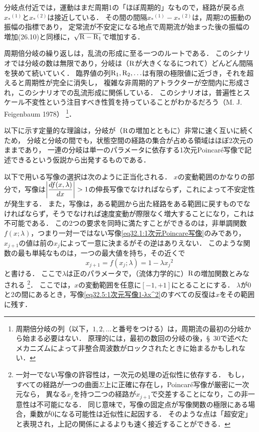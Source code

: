 分岐点付近では，運動はまだ周期1の「ほぼ周期的」なもので，経路が戻る点${x_*}^{(1)}$と${x_*}^{(2)}$は接近している．
その間の間隔${x_*}^{(1)}-{x_*}^{(2)}$は，周期2の振動の振幅の指標であり，
定常流が不安定になる地点で周期流が始まった後の振幅の増加(26.10)と同様に，$\sqrt{\mathrm{R}-\mathrm{R}_1}$で増加する．



周期倍分岐の繰り返しは，乱流の形成に至る一つのルートである．
このシナリオでは分岐の数は無限であり，分岐は（$\mathrm{R}$が大きくなるにつれて）どんどん間隔を狭めて続いていく．
臨界値の列$\mathrm{R}_1, \mathrm{R}_2, \ldots$は有限の極限値に近づき，それを超えると周期性が完全に消失し，
複雑な非周期的アトラクターが空間内に形成され，このシナリオでの乱流形成に関係している．
このシナリオは，普遍性とスケール不変性という注目すべき性質を持っていることがわかるだろう（M. J. Feigenbaum 1978）
\footnote{周期倍分岐の列（以下，$1,2,\ldots$と番号をつける）は，周期流の最初の分岐から始まる必要はない．
原理的には，最初の数回の分岐の後，\S~30で述べたメカニズムによって非整合周波数がロックされたときに始まるかもしれない．}．



以下に示す定量的な理論は，分岐が（$\mathrm{R}$の増加とともに）非常に速く互いに続くため，
分岐と分岐の間でも，状態空間の経路の集合が占める領域はほぼ2次元のままであり，
一連の分岐は単一のパラメータに依存する1次元Poincar\'{e}写像で記述できるという仮説から出発するものである．




以下で用いる写像の選択は次のように正当化される．
$x$の変動範囲のかなりの部分で，写像は$\abs{\ddv{f(x,\lambda)}{x}}>1$の伸長写像でなければならず，これによって不安定性が発生する．
また，写像は，ある範囲から出た経路をある範囲に戻すものでなければならず，そうでなければ速度変動が際限なく増大することになり，これは不可能である．
この2つの要求を同時に満たすことができるのは，非単調関数$f(x;\lambda)$，つまり一対一ではない写像\eqref{eq32.1:1次元Poincare写像}のみであり，
$x_{j+1}$の値は前の$x_j$によって一意に決まるがその逆はありえない．
このような関数の最も単純なものは，一つの最大値を持ち，その近くで
\begin{equation}\label{eq32.5:1次元写像1-λx^2}
    x_{j+1} = f(x_j; \lambda) = 1-\lambda {x_j}^2
\end{equation}
と書ける．
ここで$\lambda$は正のパラメータで，（流体力学的に）$\mathrm{R}$の増加関数とみなされる
\footnote{一対一でない写像の許容性は，一次元の処理の近似性に依存する．
もし，すべての経路が一つの曲面$\Sigma$上に正確に存在し，Poincar\'{e}写像が厳密に一次元なら，
異なる$x_j$を持つ二つの経路が$x_{j+1}$で交差することになり，この非一意性は不可能になる．
同じ意味で，写像の固定点が写像関数の極限にある場合，乗数が0になる可能性は近似性に起因する．
そのような点は「超安定」と表現され，上記の関係によるよりも速く接近することができる．}．
ここでは，$x$の変動範囲を任意に$[-1,+1]$にとることにする．
$\lambda$が0と2の間にあるとき，写像\eqref{eq32.5:1次元写像1-λx^2}のすべての反復は$x$をその範囲に残す．



